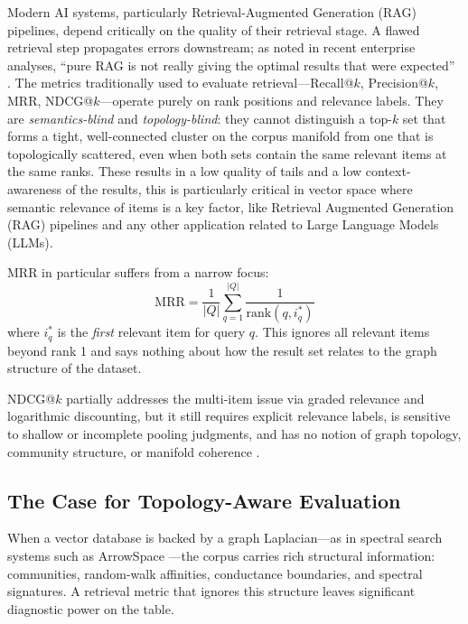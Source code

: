 \documentclass[11pt,a4paper]{article}
\begin{document}
Modern AI systems, particularly Retrieval-Augmented Generation (RAG) pipelines,
depend critically on the quality of their retrieval stage.  A flawed retrieval
step propagates errors downstream; as noted in recent enterprise analyses,
``pure RAG is not really giving the optimal results that were expected''
\cite{bruckhaus2024rag,ibm2025rag}.  The metrics traditionally used to
evaluate retrieval---Recall@$k$, Precision@$k$, MRR, NDCG@$k$---operate
purely on rank positions and relevance labels.  They are \emph{semantics-blind}
and \emph{topology-blind}: they cannot distinguish a top-$k$ set that forms a
tight, well-connected cluster on the corpus manifold from one that is
topologically scattered, even when both sets contain the same relevant items
at the same ranks. These results in a low quality of tails and a low context-awareness
of the results, this is particularly critical in vector space where semantic relevance of
items is a key factor, like Retrieval Augmented Generation (RAG) pipelines and any
other application related to Large Language Models (LLMs). 

MRR in particular suffers from a narrow focus:
\begin{equation}
  \mathrm{MRR} = \frac{1}{|Q|} \sum_{q=1}^{|Q|}
    \frac{1}{\mathrm{rank}(q, i^{*}_q)}
  \label{eq:mrr}
\end{equation}
where $i^{*}_q$ is the \emph{first} relevant item for query $q$.  This
ignores all relevant items beyond rank 1 and says nothing about how the
result set relates to the graph structure of the dataset.

NDCG@$k$ partially addresses the multi-item issue via graded relevance and
logarithmic discounting, but it still requires explicit relevance labels,
is sensitive to shallow or incomplete pooling judgments, and has no notion
of graph topology, community structure, or manifold coherence
\cite{weaviate2024metrics}.

\subsection{The Case for Topology-Aware Evaluation}

When a vector database is backed by a graph Laplacian---as in spectral
search systems such as ArrowSpace \cite{graphwiring2025}---the corpus
carries rich structural information: communities, random-walk affinities,
conductance boundaries, and spectral signatures.  A retrieval metric that
ignores this structure leaves significant diagnostic power on the table.
\end{document}
